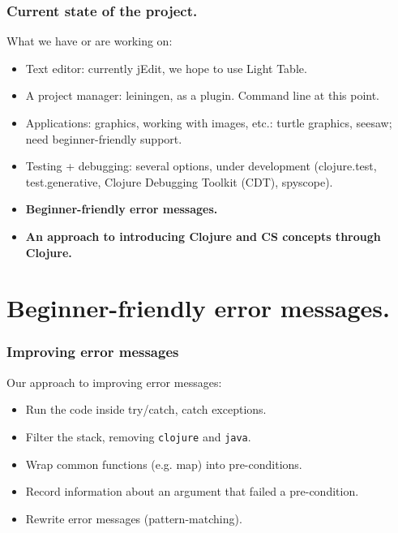 \documentclass{beamer}
\begin{document}
\begin{frame}
  \frametitle{Current state of the project.}
What we have or are working on:
\begin{itemize}
\item Text editor: currently jEdit, we hope to use Light Table. 
\item A project manager: leiningen, as a plugin. Command line at this point. 
\item Applications: graphics, working with images, etc.: turtle graphics, seesaw; need beginner-friendly support.
\item Testing + debugging: several options, under development (clojure.test, test.generative, Clojure Debugging Toolkit (CDT), spyscope).
\item{\bf  Beginner-friendly error messages.}
\item {\bf An approach to introducing Clojure and CS concepts through Clojure. }
\end{itemize}
\end{frame}

\section{Beginner-friendly error messages.}

\begin{frame}
  \frametitle{Improving error messages}
Our approach to improving error messages:
\begin{itemize}
\item Run the code inside try/catch, catch exceptions. 
\item Filter the stack, removing {\tt clojure} and {\tt java}. 
\item Wrap common functions (e.g. map) into pre-conditions. 
\item Record information about an argument that failed a pre-condition.
\item Rewrite error messages (pattern-matching). 
\end{itemize}
\end{frame}


\end{document}
